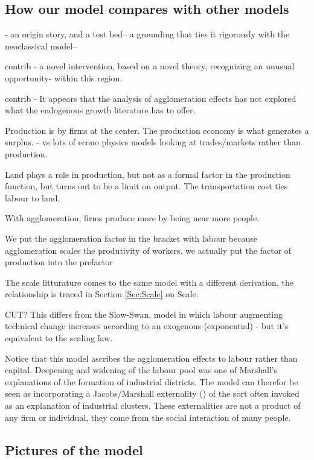 \subsection{How our model compares with other models}

- an origin story, and a test bed-- a grounding that ties it rigorously with the neoclassical model-- 


contrib - a novel intervention, based on a novel theory, recognizing an unusual opportunity- within this region.

contrib - It appears that the analysis of  agglomeration effects has not explored what the endogenous growth literature has to offer.

Production is by firms at the center. The production economy is what generates a surplus.  %
- vs lots of econo physics models looking at trades/markets rather than production.

Land plays a role in production, but not as a formal factor in the production function, but turns out to be a limit on output. The transportation cost ties labour to land. 

With agglomeration, firms produce more by being near more people.

We put the agglomeration factor in the bracket with labour because agglomeration scales the produtivity of workers.
we actually put the factor of production into the prefactor

The scale litturature comes to the same model with a different derivation, the relationship is traced in Section \ref{Sec:Scale} on Scale. 

 CUT? This differs from  the Slow-Swan, model in which labour augmenting technical change increases according to an exogenous (exponential) - but it's equivalent to the scaling law.

Notice that this model ascribes the agglomeration effects to labour rather than capital. Deepening  and widening of the labour pool was one of Marshall's explanations of the formation of industrial districts. 
The model can therefor  be seen as incorporating a Jacobs/Marshall externality (\cite{Beaudry:2009ua, Panne:2004vb}) of the sort often invoked as an explanation of industrial clusters. 
These externalities  are not a product of any firm or individual, they come from the social interaction of many people.

\subsection{Pictures of the model}

